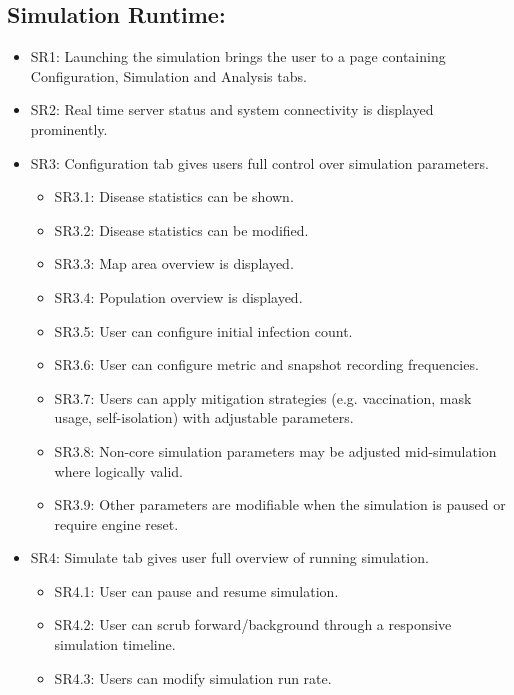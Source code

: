 \subsection{Simulation Runtime:}
\begin{itemize}
    \item\label{req:SR1} SR1: Launching the simulation brings the user to a page containing Configuration, Simulation and Analysis tabs.
    \item\label{req:SR2} SR2: Real time server status and system connectivity is displayed prominently.
    \item\label{req:SR3} SR3: Configuration tab gives users full control over simulation parameters.
    \begin{itemize}
        \item\label{req:SR3.1} SR3.1: Disease statistics can be shown.
        \item\label{req:SR3.2} SR3.2: Disease statistics can be modified.
        \item\label{req:SR3.3} SR3.3: Map area overview is displayed.
        \item\label{req:SR3.4} SR3.4: Population overview is displayed.
        \item\label{req:SR3.5} SR3.5: User can configure initial infection count.
        \item\label{req:SR3.6} SR3.6: User can configure metric and snapshot recording frequencies.
        \item\label{req:SR3.7} SR3.7: Users can apply mitigation strategies (e.g. vaccination, mask usage, self-isolation) with adjustable parameters.
        \item\label{req:SR3.8} SR3.8: Non-core simulation parameters may be adjusted mid-simulation where logically valid.
        \item\label{req:SR3.9} SR3.9: Other parameters are modifiable when the simulation is paused or require engine reset.
    \end{itemize}
    \item\label{req:SR4} SR4: Simulate tab gives user full overview of running simulation.
    \begin{itemize}
        \item\label{req:SR4.1} SR4.1: User can pause and resume simulation.
        \item\label{req:SR4.2} SR4.2: User can scrub forward/background through a responsive simulation timeline.
        \item\label{req:SR4.3} SR4.3: Users can modify simulation run rate.

\end{itemize}
\end{itemize}
